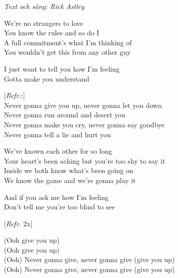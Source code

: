 {\footnotesize\textit{Text och sång: Rick Astley}}\par
\vspace{10pt}
We're no strangers to love\\
You know the rules and so do I\\
A full commitment's what I'm thinking of\\
You wouldn't get this from any other guy\par
\vspace{10pt}
I just want to tell you how I'm feeling\\
Gotta make you understand\par
\vspace{10pt}
{\footnotesize[\textit{Refr.}:]}\\
Never gonna give you up, never gonna let you down\\
Never gonna run around and desert you\\
Never gonna make you cry, never gonna say goodbye\\
Never gonna tell a lie and hurt you\par
\vspace{10pt}
We've known each other for so long\\
Your heart's been aching but you're too shy to say it\\
Inside we both know what's been going on\\
We know the game and we're gonna play it\par
\vspace{10pt}
And if you ask me how I'm feeling \\
Don't tell me you're too blind to see\par
\vspace{10pt}
{\footnotesize[\textit{Refr.} 2x]}\par%
\vspace{10pt}
(Ooh give you up)\\
(Ooh give you up)\\
(Ooh) Never gonna give, never gonna give (give you up)\\
(Ooh) Never gonna give, never gonna give (give you up)\par
